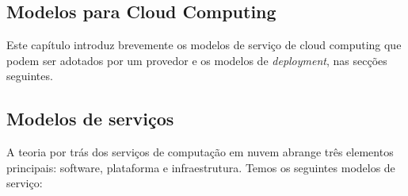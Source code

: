         \subsection{Modelos para Cloud Computing}

        Este capítulo introduz brevemente os modelos de serviço de cloud computing que podem ser adotados por um provedor e os modelos de     \textit{deployment}, nas secções seguintes.

\subsection{Modelos de serviços}

A teoria por trás dos serviços de computação em nuvem abrange três elementos principais: software, plataforma e infraestrutura. Temos os seguintes modelos de serviço:

